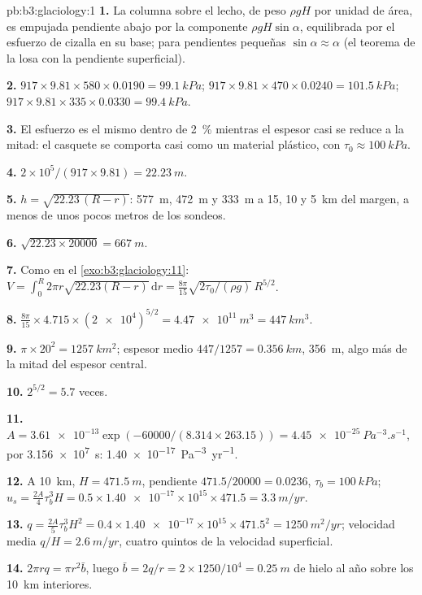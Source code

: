 \begin{solution}{pb:b3:glaciology:1}
\textbf{1.} La columna sobre el lecho, de peso $\rho gH$ por unidad de área, es
empujada pendiente abajo por la componente $\rho gH\sin\alpha$, equilibrada por el
esfuerzo de cizalla en su base; para pendientes pequeñas $\sin\alpha \approx \alpha$ (el
teorema de la losa con la pendiente superficial).

\textbf{2.} $917\times9.81\times580\times0.0190 = \qty{99.1}{kPa}$;
$917\times9.81\times470\times0.0240 = \qty{101.5}{kPa}$; $917\times9.81
\times335\times0.0330 = \qty{99.4}{kPa}$.

\textbf{3.} El esfuerzo es el mismo dentro de \qty{2}{\percent} mientras el
espesor casi se reduce a la mitad: el casquete se comporta casi como un material plástico, con $\tau_0 \approx
\qty{100}{kPa}$.

\textbf{4.} $2\times10^5/(917\times9.81) = \qty{22.23}{m}$.

\textbf{5.} $h = \sqrt{22.23\,(R - r)}$: \qty{577}{m}, \qty{472}{m} y
\qty{333}{m} a 15, 10 y \qty{5}{km} del margen, a menos de unos pocos metros
de los sondeos.

\textbf{6.} $\sqrt{22.23\times20000} = \qty{667}{m}$.

\textbf{7.} Como en el \cref{exo:b3:glaciology:11}: $V = \int_0^R2\pi r
\sqrt{22.23(R - r)}\,\mathrm dr = \frac{8\pi}{15}\sqrt{2\tau_0/(\rho
g)}\,R^{5/2}$.

\textbf{8.} $\frac{8\pi}{15}\times4.715\times(\num{2e4})^{5/2} =
\qty{4.47e11}{m^3} = \qty{447}{km^3}$.

\textbf{9.} $\pi\times20^2 = \qty{1257}{km^2}$; espesor medio
$447/1257 = \qty{0.356}{km}$, \qty{356}{m}, algo más de la mitad del
espesor central.

\textbf{10.} $2^{5/2} = 5.7$ veces.

\textbf{11.} $A = \num{3.61e-13}\exp(-60000/(8.314\times263.15)) =
\qty{4.45e-25}{Pa^{-3}.s^{-1}}$, por \qty{3.156e7}{s}:
\qty{1.40e-17}{Pa^{-3}.yr^{-1}}.

\textbf{12.} A \qty{10}{km}, $H = \qty{471.5}{m}$, pendiente $471.5/20000 =
\num{0.0236}$, $\tau_b = \qty{100}{kPa}$; $u_s = \tfrac{2A}{4}\tau_b^3H =
0.5\times\num{1.40e-17}\times10^{15}\times471.5 = \qty{3.3}{m/yr}$.

\textbf{13.} $q = \tfrac{2A}{5}\tau_b^3H^2 = 0.4\times\num{1.40e-17}
\times10^{15}\times471.5^2 = \qty{1250}{m^2/yr}$; velocidad media $q/H =
\qty{2.6}{m/yr}$, cuatro quintos de la velocidad superficial.

\textbf{14.} $2\pi rq = \pi r^2\bar b$, luego $\bar b = 2q/r = 2\times1250/10^4
= \qty{0.25}{m}$ de hielo al año sobre los \qty{10}{km} interiores.


\end{solution}
